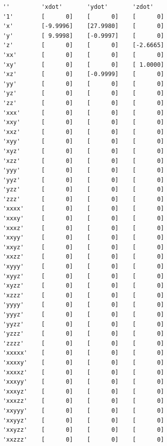\documentclass[onecolumn,11pt]{article}
\begin{document}
\begin{table}[where]
\caption{\small Lorenz system identified using sparse representation with $\eta=1.0$.}
\begin{center}
{\footnotesize
\begin{verbatim}
    ''         'xdot'       'ydot'       'zdot'   
    '1'        [      0]    [      0]    [      0]
    'x'        [-9.9996]    [27.9980]    [      0]
    'y'        [ 9.9998]    [-0.9997]    [      0]
    'z'        [      0]    [      0]    [-2.6665]
    'xx'       [      0]    [      0]    [      0]
    'xy'       [      0]    [      0]    [ 1.0000]
    'xz'       [      0]    [-0.9999]    [      0]
    'yy'       [      0]    [      0]    [      0]
    'yz'       [      0]    [      0]    [      0]
    'zz'       [      0]    [      0]    [      0]
    'xxx'      [      0]    [      0]    [      0]
    'xxy'      [      0]    [      0]    [      0]
    'xxz'      [      0]    [      0]    [      0]
    'xyy'      [      0]    [      0]    [      0]
    'xyz'      [      0]    [      0]    [      0]
    'xzz'      [      0]    [      0]    [      0]
    'yyy'      [      0]    [      0]    [      0]
    'yyz'      [      0]    [      0]    [      0]
    'yzz'      [      0]    [      0]    [      0]
    'zzz'      [      0]    [      0]    [      0]
    'xxxx'     [      0]    [      0]    [      0]
    'xxxy'     [      0]    [      0]    [      0]
    'xxxz'     [      0]    [      0]    [      0]
    'xxyy'     [      0]    [      0]    [      0]
    'xxyz'     [      0]    [      0]    [      0]
    'xxzz'     [      0]    [      0]    [      0]
    'xyyy'     [      0]    [      0]    [      0]
    'xyyz'     [      0]    [      0]    [      0]
    'xyzz'     [      0]    [      0]    [      0]
    'xzzz'     [      0]    [      0]    [      0]
    'yyyy'     [      0]    [      0]    [      0]
    'yyyz'     [      0]    [      0]    [      0]
    'yyzz'     [      0]    [      0]    [      0]
    'yzzz'     [      0]    [      0]    [      0]
    'zzzz'     [      0]    [      0]    [      0]
    'xxxxx'    [      0]    [      0]    [      0]
    'xxxxy'    [      0]    [      0]    [      0]
    'xxxxz'    [      0]    [      0]    [      0]
    'xxxyy'    [      0]    [      0]    [      0]
    'xxxyz'    [      0]    [      0]    [      0]
    'xxxzz'    [      0]    [      0]    [      0]
    'xxyyy'    [      0]    [      0]    [      0]
    'xxyyz'    [      0]    [      0]    [      0]
    'xxyzz'    [      0]    [      0]    [      0]
    'xxzzz'    [      0]    [      0]    [      0]

\end{verbatim}}
\end{center}
\end{table}
\end{document}
